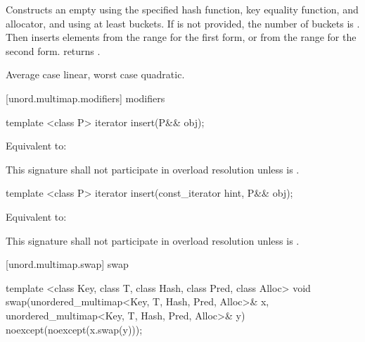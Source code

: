 \begin{itemdescr}
\pnum
\effects Constructs an empty  using the
specified hash function, key equality function, and allocator, and
using at least  buckets. If  is not
provided, the number of buckets is . Then
inserts elements from the range 
for the first form, or from the range 
 for the second form.
 returns .

\pnum
\complexity Average case linear, worst case quadratic.
\end{itemdescr}

[unord.multimap.modifiers]{ modifiers}

%
%
\begin{itemdecl}
template <class P>
  iterator insert(P&& obj);
\end{itemdecl}

\begin{itemdescr}
\pnum
\effects Equivalent to: 

\pnum
\remarks This signature shall not participate in overload resolution
unless  is .
\end{itemdescr}

%
%
\begin{itemdecl}
template <class P>
  iterator insert(const_iterator hint, P&& obj);
\end{itemdecl}

\begin{itemdescr}
\pnum
\effects Equivalent to:

\pnum
\remarks This signature shall not participate in overload resolution
unless  is .
\end{itemdescr}

[unord.multimap.swap]{ swap}

%
%
\begin{itemdecl}
template <class Key, class T, class Hash, class Pred, class Alloc>
  void swap(unordered_multimap<Key, T, Hash, Pred, Alloc>& x,
            unordered_multimap<Key, T, Hash, Pred, Alloc>& y)
    noexcept(noexcept(x.swap(y)));
\end{itemdecl}


